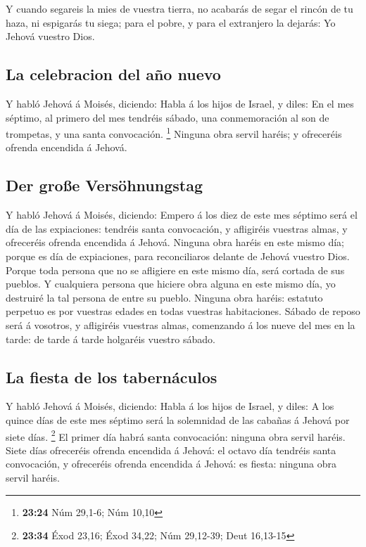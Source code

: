  Y cuando segareis la mies de vuestra tierra, no acabarás
de segar el rincón de tu haza, ni espigarás tu siega; para el pobre, y
para el extranjero la dejarás: Yo Jehová vuestro Dios.

\hypertarget{la-celebracion-del-auxf1o-nuevo}{%
\subsection{La celebracion del año
nuevo}\label{la-celebracion-del-auxf1o-nuevo}}

 Y habló Jehová á Moisés, diciendo:  Habla
á los hijos de Israel, y diles: En el mes séptimo, al primero del mes
tendréis sábado, una conmemoración al son de trompetas, y una santa
convocación. \footnote{\textbf{23:24} Núm 29,1-6; Núm 10,10}
 Ninguna obra servil haréis; y ofreceréis ofrenda
encendida á Jehová.

\hypertarget{der-grouxdfe-versuxf6hnungstag}{%
\subsection{Der große
Versöhnungstag}\label{der-grouxdfe-versuxf6hnungstag}}

 Y habló Jehová á Moisés, diciendo: 
Empero á los diez de este mes séptimo será el día de las expiaciones:
tendréis santa convocación, y afligiréis vuestras almas, y ofreceréis
ofrenda encendida á Jehová.  Ninguna obra haréis en este
mismo día; porque es día de expiaciones, para reconciliaros delante de
Jehová vuestro Dios.  Porque toda persona que no se
afligiere en este mismo día, será cortada de sus pueblos.
 Y cualquiera persona que hiciere obra alguna en este
mismo día, yo destruiré la tal persona de entre su pueblo.
 Ninguna obra haréis: estatuto perpetuo es por vuestras
edades en todas vuestras habitaciones.  Sábado de reposo
será á vosotros, y afligiréis vuestras almas, comenzando á los nueve del
mes en la tarde: de tarde á tarde holgaréis vuestro sábado.

\hypertarget{la-fiesta-de-los-tabernuxe1culos}{%
\subsection{La fiesta de los
tabernáculos}\label{la-fiesta-de-los-tabernuxe1culos}}

 Y habló Jehová á Moisés, diciendo:  Habla
á los hijos de Israel, y diles: A los quince días de este mes séptimo
será la solemnidad de las cabañas á Jehová por siete días. \footnote{\textbf{23:34}
  Éxod 23,16; Éxod 34,22; Núm 29,12-39; Deut 16,13-15} 
El primer día habrá santa convocación: ninguna obra servil haréis.
 Siete días ofreceréis ofrenda encendida á Jehová: el
octavo día tendréis santa convocación, y ofreceréis ofrenda encendida á
Jehová: es fiesta: ninguna obra servil haréis.

